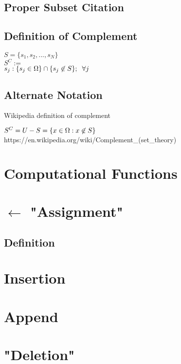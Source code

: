 \documentclass[11pt]{article}
\begin{document}
\subsection{Proper Subset Citation}




\subsection{Definition of Complement}
\begin{center}
$
S = \{ s_1,s_2,...,s_N \}
$
\\
$
S^C :=
$
\\
$
s_j: \{ s_j \in \Omega\} \cap \{s_j \not \in S\}; \hspace{2mm} \forall j
$
\end{center}
\subsection{Alternate Notation}
Wikipedia definition of complement
\begin{center}
$
S^C = U - S = \{x \in \Omega : x \not \in S\} \hspace{3mm} 
$
https://en.wikipedia.org/wiki/Complement\_(set\_theory)
\end{center}



\section*{Computational Functions}
\section{$\leftarrow$ "Assignment"}
\subsection{Definition}

\section{Insertion}

\section{Append}

\section{"Deletion"}
\end{document}
